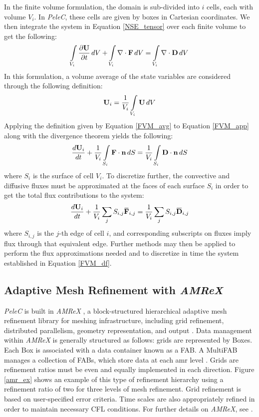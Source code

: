 In the finite volume formulation, the domain is sub-divided into $i$ cells, each with volume $V_i$. In \textit{PeleC}, these cells are given by boxes in Cartesian coordinates. We then integrate the system in Equation \ref{NSE_tensor} over each finite volume to get the following:
\begin{equation} \label{FVM_app}
\int\limits_{V_i} \dfrac{\partial \vb{U}}{\partial t}\, dV + \int\limits_{V_i} \nabla \cdot \vb{F}\, dV = \int\limits_{V_i} \nabla \cdot \vb{D}\, dV
\end{equation}
In this formulation, a volume average of the state variables are considered through the following definition:
\begin{equation} \label{FVM_avg}
\vb{U}_i = \dfrac{1}{V_i} \int\limits_{V_i} \vb{U} \, dV
\end{equation} 
Applying the definition given by Equation \ref{FVM_avg} to Equation \ref{FVM_app} along with the divergence theorem yields the following:
\begin{equation} \label{FVM}
\dfrac{d\vb{U}_i}{dt} + \dfrac{1}{V_i} \int\limits_{S_i} \vb{F}\cdot \vb{n}\, dS = \dfrac{1}{V_i} \int\limits_{S_i} \vb{D} \cdot \vb{n} \, dS 
\end{equation}
where $S_i$ is the surface of cell $V_i$. To discretize further, the convective and diffusive fluxes must be approximated at the faces of each surface $S_i$ in order to get the total flux contributions to the system:
\begin{equation} \label{FVM_df}
\dfrac{d\vb{U}_i}{dt} +  \dfrac{1}{V_i} \sum\limits_j S_{i,j} \overbar{\vb{F}}_{i,j} =  \dfrac{1}{V_i}\sum\limits_j S_{i,j} \overbar{\vb{D}}_{i,j}
\end{equation}
where $S_{i,j}$ is the $j$-th edge of cell $i$, and corresponding subscripts on fluxes imply flux through that equivalent edge. Further methods may then be applied to perform the flux approximations needed and to discretize in time the system established in Equation \ref{FVM_df}. 

\subsection{Adaptive Mesh Refinement with \textit{AMReX}}
\textit{PeleC} is built in \textit{AMReX} \cite{}, a block-structured hierarchical adaptive mesh refinement library for meshing infrastructure, including grid refinement, distributed parallelism, geometry representation, and output \cite{}. Data management within \textit{AMReX} is generally structured as follows: grids are represented by Boxes. Each Box is associated with a data container known as a FAB. A MultiFAB manages a collection of FABs, which store data at each \gls{amr} level \cite{}. Grids are refinement ratios must be even and equally implemented in each direction. Figure \ref{amr_ex} shows an example of this type of refinement hierarchy using a refinement ratio of two for three levels of mesh refinement. Grid refinement is based on user-specified error criteria. Time scales are also appropriately refined in order to maintain necessary CFL conditions. For further details on \textit{AMReX}, see \cite{}. 

